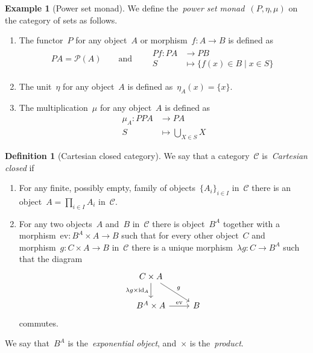 \documentclass[a4paper]{article}
\theoremstyle{plain}
\theoremstyle{definition}
\newtheorem{definition}[theorem]{Definition}
\newtheorem{example}[theorem]{Example}
\newcommand{\id}{\mathrm{id}}
\newcommand{\ev}{\mathrm{ev}}
\newcommand{\cat}[1]{\mathcal{#1}}
\begin{document}
\begin{example}[Power set monad]
    \label{monad:power-set}
    We define the~\emph{power set monad}~\((P,\eta,\mu)\) on the category of
    sets as follows.
    \begin{enumerate}
        \item The functor~\(P\) for any object~\(A\) or
            morphism~\(f:A\longrightarrow B\) is defined as
            \begin{gather*}
                PA = \mathcal{P}(A)
                \qquad\text{and}\qquad
                \begin{split}
                    Pf:PA&\longrightarrow PB \\
                    S&\longmapsto\{f(x)\in B \mid x\in S\}
                \end{split}
            \end{gather*}
        \item The unit~\(\eta\) for any object~\(A\) is defined
            as~\(\eta_{A}(x)=\{x\}\).
        \item The multiplication~\(\mu\) for any object~\(A\) is defined as
            \begin{align*}
                \mu_{A}:PPA&\longrightarrow PA \\
                S&\longmapsto \bigcup_{X\in S}X
            \end{align*}
    \end{enumerate}
\end{example}

\begin{definition}[Cartesian closed category]
    \label{def:product}
    \label{def:cartesian-closed}
    \label{def:exponential object}
    We say that a category~\(\cat{C}\) is~\emph{Cartesian closed} if
    \begin{enumerate}
        \item For any finite, possibly empty, family of
            objects~\(\{A_{i}\}_{i\in I}\) in~\(\cat{C}\) there is an
            object~\(A=\prod_{i\in I}A_{i}\) in~\(\cat{C}\).
        \item For any two objects~\(A\) and~\(B\) in~\(\cat{C}\) there is
            object~\(B^{A}\) together with a
            morphism~\(\ev:B^{A}\times A\longrightarrow B\) such that for every
            other object~\(C\) and morphism~\(g:C\times A\longrightarrow B\)
            in~\(\cat{C}\) there is a unique
            morphism~\(\lambda g:C\longrightarrow B^{A}\) such that the diagram
            \[\begin{tikzcd}
                C\times A \arrow[dr, "g"] \arrow[d, "\lambda g\times\id_{A}", swap] & \\
                B^{A}\times A \arrow[r, "\ev"] & B
            \end{tikzcd}\]
            commutes.
    \end{enumerate}
    We say that~\(B^{A}\) is the~\emph{exponential object}, and~\(\times\) is
    the~\emph{product}.
\end{definition}
\end{document}
